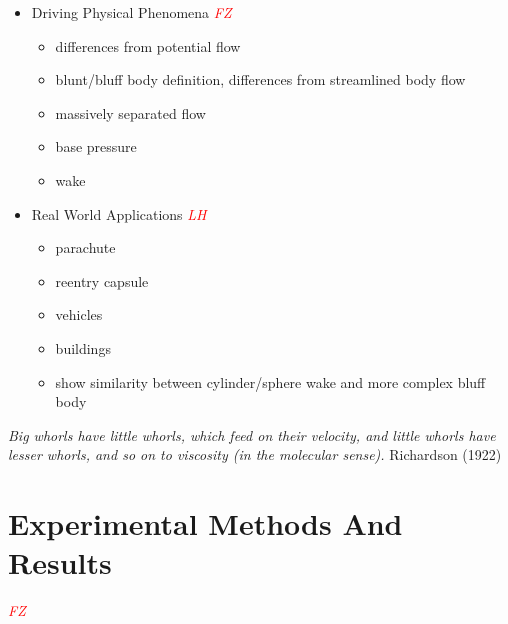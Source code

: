 \documentclass[journal]{new-aiaa}
\begin{document}
\begin{itemize}
    \item Driving Physical Phenomena \textcolor{red}{\emph{FZ}}

    \begin{itemize}
        \item differences from potential flow
        \item blunt/bluff body definition, differences from streamlined body flow
        \item massively separated flow
        \item base pressure
        \item wake
    \end{itemize}
    \item Real World Applications \textcolor{red}{\emph{LH}}
    \begin{itemize}
        \item parachute
        \item reentry capsule
        \item vehicles
        \item buildings
        \item show similarity between cylinder/sphere wake and more complex bluff body
    \end{itemize}
\end{itemize}






\emph{Big whorls have little whorls, which feed on their velocity, and little whorls have lesser whorls, and so on to viscosity (in the molecular sense).}
Richardson (1922) \cite{richardson1922weather}




\section{Experimental Methods And Results} \label{sec:experimentalmethods}

\textcolor{red}{\emph{FZ}}
\end{document}
